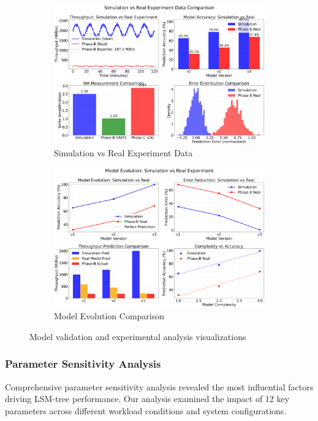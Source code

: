 \documentclass[11pt]{article}
\begin{document}
\begin{figure}[H]
\centering
\begin{subfigure}{0.48\textwidth}
\centering
\includegraphics[width=\textwidth]{experiments/2025-09-05/simulation_vs_real_comparison.png}
\caption{Simulation vs Real Experiment Data}
\label{fig:simulation_vs_real}
\end{subfigure}
\hfill
\begin{subfigure}{0.48\textwidth}
\centering
\includegraphics[width=\textwidth]{experiments/2025-09-05/model_evolution_comparison.png}
\caption{Model Evolution Comparison}
\label{fig:model_evolution}
\end{subfigure}
\caption{Model validation and experimental analysis visualizations}
\end{figure}

\subsubsection{Parameter Sensitivity Analysis}
Comprehensive parameter sensitivity analysis revealed the most influential factors driving LSM-tree performance. Our analysis examined the impact of 12 key parameters across different workload conditions and system configurations.
\end{document}
